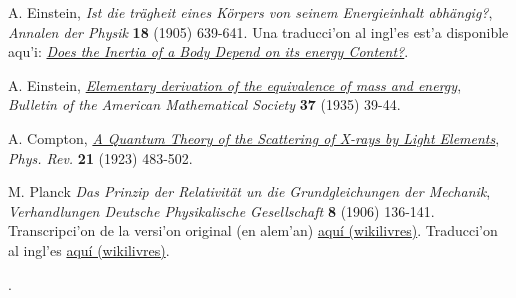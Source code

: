 \begin{thebibliography}{99}
 A. Einstein, \textit{Ist die tr\"agheit eines K\"orpers von seinem Energieinhalt abh\"angig?}, {\sl Annalen der Physik} {\bf 18} (1905) 639-641. Una traducci'on al ingl'es est'a disponible aqu'i: \href{{https://www.fourmilab.ch/etexts/einstein/E_mc2/e_mc2.pdf}}{\textit{Does the Inertia of a Body Depend on its energy Content?}}.

 A. Einstein, \href{http://www.ams.org/journals/bull/2000-37-01/S0273-0979-99-00805-8/S0273-0979-99-00805-8.pdf}
{\textit{Elementary derivation of the equivalence of mass and energy}}, {\sl Bulletin of the American Mathematical Society} {\bf 37} (1935) 39-44.

 A. Compton, \href{http://prola.aps.org/abstract/PR/v21/i5/p483_1}{\it A Quantum Theory of the Scattering of X-rays by Light Elements}, {\sl Phys. Rev.} {\bf 21} (1923) 483-502.

 M. Planck {\it Das Prinzip der Relativit\"at un die Grundgleichungen der Mechanik}, {\sl Verhandlungen Deutsche Physikalische Gesellschaft} {\bf 8} (1906) 136-141. Transcripci'on de la versi'on original (en alem'an) \href{http://wikilivres.ca/wiki/Das_Prinzip_der_Relativit\%C3\%A4t_und_die_Grundgleichungen_der_Mechanik}{aqu\'i (wikilivres)}. Traducci'on al ingl'es  \href{http://en.wikisource.org/wiki/Translation:The_Principle_of_Relativity_and_the_Fundamental_Equations_of_Mechanics}{aqu\'i (wikilivres)}.

\end{thebibliography}.
